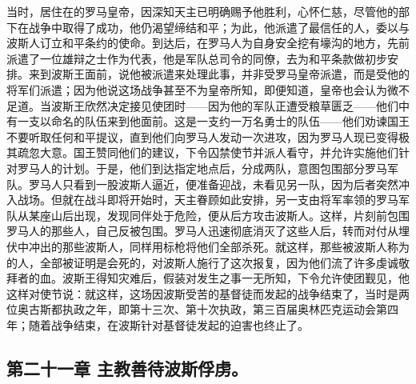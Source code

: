 当时，居住在的罗马皇帝，因深知天主已明确赐予他胜利，心怀仁慈，尽管他的部下在战争中取得了成功，他仍渴望缔结和平；为此，他派遣了最信任的人，委以与波斯人订立和平条约的使命。到达后，在罗马人为自身安全挖有壕沟的地方，先前派遣了一位雄辩之士作为代表，他是军队总司令的同僚，去为和平条款做初步安排。来到波斯王面前，说他被派遣来处理此事，并非受罗马皇帝派遣，而是受他的将军们派遣；因为他说这场战争甚至不为皇帝所知，即便知道，皇帝也会认为微不足道。当波斯王欣然决定接见使团时——因为他的军队正遭受粮草匮乏——他们中有一支以命名的队伍来到他面前。这是一支约一万名勇士的队伍——他们劝谏国王不要听取任何和平提议，直到他们向罗马人发动一次进攻，因为罗马人现已变得极其疏忽大意。国王赞同他们的建议，下令囚禁使节并派人看守，并允许实施他们针对罗马人的计划。于是，他们到达指定地点后，分成两队，意图包围部分罗马军队。罗马人只看到一股波斯人逼近，便准备迎战，未看见另一队，因为后者突然冲入战场。但就在战斗即将开始时，天主眷顾如此安排，另一支由将军率领的罗马军队从某座山后出现，发现同伴处于危险，便从后方攻击波斯人。这样，片刻前包围罗马人的那些人，自己反被包围。罗马人迅速彻底消灭了这些人后，转而对付从埋伏中冲出的那些波斯人，同样用标枪将他们全部杀死。就这样，那些被波斯人称为的人，全部被证明是会死的，对波斯人施行了这次报复，因为他们流了许多虔诚敬拜者的血。波斯王得知灾难后，假装对发生之事一无所知，下令允许使团觐见，他这样对使节说：就这样，这场因波斯受苦的基督徒而发起的战争结束了，当时是两位奥古斯都执政之年，即第十三次、第十次执政，第三百届奥林匹克运动会第四年；随着战争结束，在波斯针对基督徒发起的迫害也终止了。\par


\subsection{第二十一章 主教善待波斯俘虏。}

